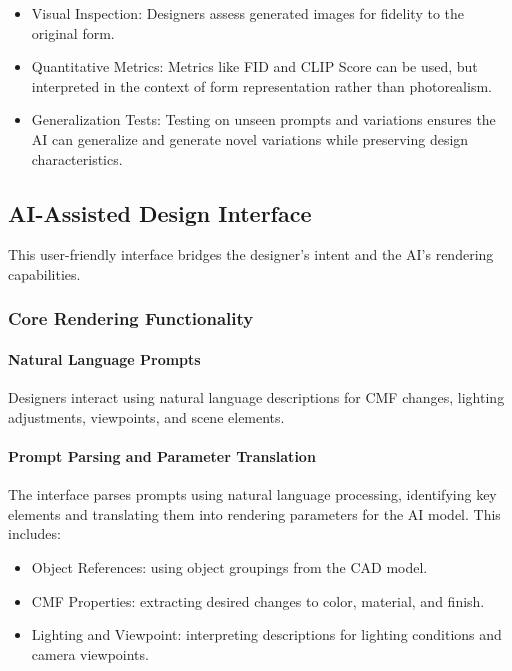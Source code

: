 \documentclass[12pt]{article}
\begin{document}
\begin{itemize}
    \item Visual Inspection: Designers assess generated images for fidelity to the original form.
    \item Quantitative Metrics: Metrics like FID and CLIP Score can be used, but interpreted in the context of form representation rather than photorealism.
    \item Generalization Tests: Testing on unseen prompts and variations ensures the AI can generalize and generate novel variations while preserving design characteristics.
\end{itemize}

\subsection{AI-Assisted Design Interface}
This user-friendly interface bridges the designer's intent and the AI's rendering capabilities.

\subsubsection{Core Rendering Functionality}

\paragraph{Natural Language Prompts}
Designers interact using natural language descriptions for CMF changes, lighting adjustments, viewpoints, and scene elements.

\paragraph{Prompt Parsing and Parameter Translation}
The interface parses prompts using natural language processing, identifying key elements and translating them into rendering parameters for the AI model. This includes:

\begin{itemize}
    \item Object References: using object groupings from the CAD model.
    \item CMF Properties: extracting desired changes to color, material, and finish.
    \item Lighting and Viewpoint: interpreting descriptions for lighting conditions and camera viewpoints.
\end{itemize}
\end{document}
